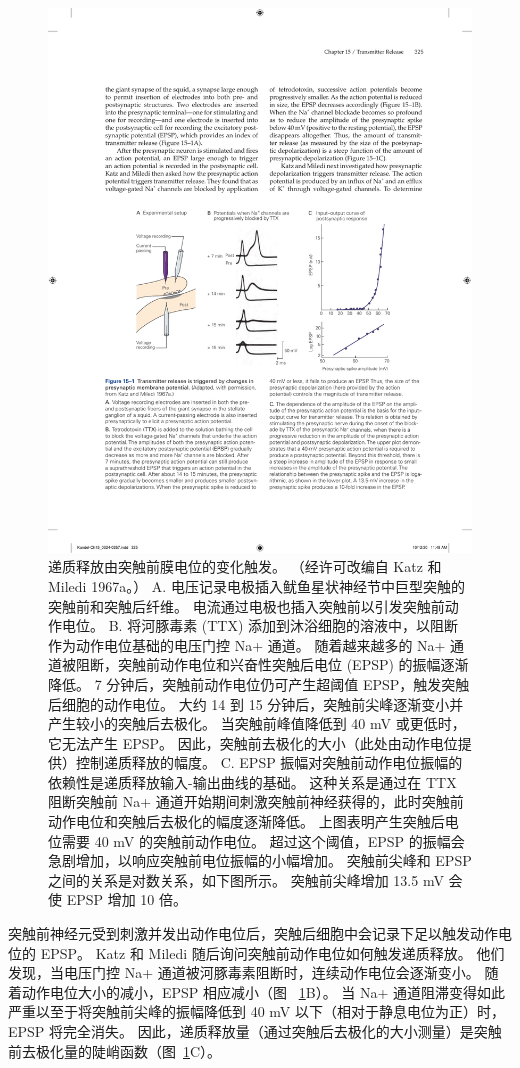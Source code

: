 \begin{figure}[htbp]
	\centering
	\includegraphics[width=0.8\linewidth]{chap15/fig_15_1}
	\caption{递质释放由突触前膜电位的变化触发。 （经许可改编自 Katz 和 Miledi 1967a。） A. 电压记录电极插入鱿鱼星状神经节中巨型突触的突触前和突触后纤维。 电流通过电极也插入突触前以引发突触前动作电位。 B. 将河豚毒素 (TTX) 添加到沐浴细胞的溶液中，以阻断作为动作电位基础的电压门控 Na+ 通道。 随着越来越多的 Na+ 通道被阻断，突触前动作电位和兴奋性突触后电位 (EPSP) 的振幅逐渐降低。 7 分钟后，突触前动作电位仍可产生超阈值 EPSP，触发突触后细胞的动作电位。 大约 14 到 15 分钟后，突触前尖峰逐渐变小并产生较小的突触后去极化。 当突触前峰值降低到 40 mV 或更低时，它无法产生 EPSP。 因此，突触前去极化的大小（此处由动作电位提供）控制递质释放的幅度。 C. EPSP 振幅对突触前动作电位振幅的依赖性是递质释放输入-输出曲线的基础。 这种关系是通过在 TTX 阻断突触前 Na+ 通道开始期间刺激突触前神经获得的，此时突触前动作电位和突触后去极化的幅度逐渐降低。 上图表明产生突触后电位需要 40 mV 的突触前动作电位。 超过这个阈值，EPSP 的振幅会急剧增加，以响应突触前电位振幅的小幅增加。 突触前尖峰和 EPSP 之间的关系是对数关系，如下图所示。 突触前尖峰增加 13.5 mV 会使 EPSP 增加 10 倍。}
	\label{fig:15_1}
\end{figure}


突触前神经元受到刺激并发出动作电位后，突触后细胞中会记录下足以触发动作电位的 EPSP。
Katz 和 Miledi 随后询问突触前动作电位如何触发递质释放。
他们发现，当电压门控 Na+ 通道被河豚毒素阻断时，连续动作电位会逐渐变小。
随着动作电位大小的减小，EPSP 相应减小（图 ~\ref{fig:15_1}B）。
当 Na+ 通道阻滞变得如此严重以至于将突触前尖峰的振幅降低到 40 mV 以下（相对于静息电位为正）时，EPSP 将完全消失。
因此，递质释放量（通过突触后去极化的大小测量）是突触前去极化量的陡峭函数（图~\ref{fig:15_1}C）。


